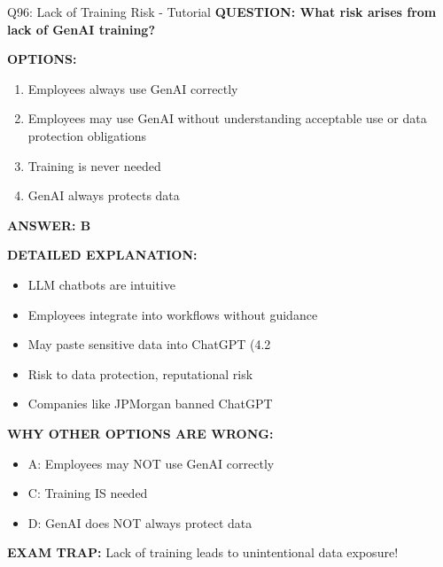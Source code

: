 \documentclass[8pt]{beamer}
\begin{document}
	\begin{frame}{Q96: Lack of Training Risk - Tutorial}
		\fontsize{6.5}{7.5}\selectfont
		\textbf{QUESTION: What risk arises from lack of GenAI training?}
		
		\vspace{0.1cm}
		\textbf{OPTIONS:}
		\begin{enumerate}
			\item Employees always use GenAI correctly
			\item Employees may use GenAI without understanding acceptable use or data protection obligations
			\item Training is never needed
			\item GenAI always protects data
		\end{enumerate}
		
		\vspace{0.1cm}
		\textcolor{myblue}{\textbf{ANSWER: B}}
		
		\vspace{0.1cm}
		\textbf{DETAILED EXPLANATION:}
		\begin{itemize}
			\item LLM chatbots are intuitive
			\item Employees integrate into workflows without guidance
			\item May paste sensitive data into ChatGPT (4.2%
			\item Risk to data protection, reputational risk
			\item Companies like JPMorgan banned ChatGPT
		\end{itemize}
		
		\vspace{0.1cm}
		\textcolor{myred}{\textbf{WHY OTHER OPTIONS ARE WRONG:}}
		\begin{itemize}
			\item \textcolor{myred}{A:} Employees may NOT use GenAI correctly
			\item \textcolor{myred}{C:} Training IS needed
			\item \textcolor{myred}{D:} GenAI does NOT always protect data
		\end{itemize}
		
		\textcolor{myred}{\textbf{EXAM TRAP:}} Lack of training leads to \textcolor{myblue}{unintentional data exposure}!
	\end{frame}
	
\end{document}

